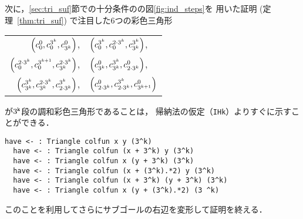 次に，\ref{sec:tri_suf}節での十分条件のの図\ref{fig:ind_steps}を
用いた証明 (定理~\ref{thm:tri_suf}) で注目した6つの彩色三角形
\begin{center}
  \begin{tabular}{rl}
    $\left(c^{0}_{0},c^{3^{k}}_{0},c^{0}_{3^{k}}\right)$,
    &
    $\left(c^{3^{k}}_{0},c^{2\cdot3^{k}}_{0},c^{3^{k}}_{3^{k}}\right)$,
    \\
    $\left(c^{2\cdot3^{k}}_{0},c^{3^{k+1}}_{0},c^{2\cdot3^{k}}_{3^{k}}\right)$,
    &
    $\left(c^{0}_{3^{k}},c^{3^{k}}_{3^{k}},c^{0}_{2\cdot3^{k}}\right)$,
    \\
    $\left(c^{3^{k}}_{3^{k}},c^{2\cdot3^{k}}_{3^{k}},c^{3^{k}}_{2\cdot3^{k}}\right)$,
    &
    $\left(c^{0}_{2\cdot3^{k}},c^{3^{k}}_{2\cdot3^{k}},c^{0}_{3^{k+1}}\right)$
  \end{tabular}
\end{center}
が$3^{\tt{k}}$段の調和彩色三角形であることは，
帰納法の仮定（{\tt{IHk}}）よりすぐに示すことができる．
\begin{lstlisting}[language=Coq]
  have <- : Triangle colfun x y (3^k)
  have <- : Triangle colfun (x + 3^k) y (3^k)
  have <- : Triangle colfun x (y + 3^k) (3^k)
  have <- : Triangle colfun (x + (3^k).*2) y (3^k)
  have <- : Triangle colfun (x + 3^k) (y + 3^k) (3^k)
  have <- : Triangle colfun x (y + (3^k).*2) (3 ^k)
\end{lstlisting}
このことを利用してさらにサブゴールの右辺を変形して証明を終える．

